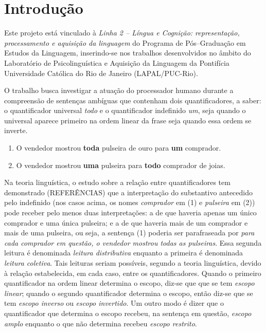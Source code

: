 \chapter{Introdução}
Este projeto está vinculado à \emph{Linha 2 -- Língua e Cognição: representação, processamento e aquisição da linguagem} do Programa de Pós--Graduação em Estudos da Linguagem, inserindo-se nos trabalhos desenvolvidos no âmbito do Laboratório de Psicolinguística e Aquisição da Linguagem da Pontifícia Universidade Católica do Rio de Janeiro (LAPAL/PUC-Rio).

O trabalho busca investigar a atuação do processador humano durante a compreensão de sentenças ambíguas que contenham dois quantificadores, a saber: o quantificador universal \emph{todo} e o quantificador indefinido \emph{um}, seja quando o universal aparece primeiro na ordem linear da frase seja quando essa ordem se inverte.

\begin{enumerate}
  \item O vendedor mostrou \textbf{toda} pulseira de ouro para \textbf{um} comprador.
  \item O vendedor mostrou \textbf{uma} pulseira para \textbf{todo} comprador de joias.
\end{enumerate}

Na teoria linguística, o estudo sobre a relação entre quantificadores tem demonstrado (REFERÊNCIAS) que a interpretação do substantivo antecedido pelo indefinido (nos casos acima, os nomes \emph{comprador} em (1) e \emph{pulseira} em (2)) pode receber pelo menos duas interpretações: a de que haveria apenas um único comprador e uma única pulseira; e a de que haveria mais de um comprador e mais de uma pulseira, ou seja, a sentença (1) poderia ser parafraseada por \emph{para cada comprador em questão, o vendedor mostrou todas as pulseiras}.
Essa segunda leitura é denominada \emph{leitura distributiva} enquanto a primeira é denominada \emph{leitura coletiva}. Tais leituras seriam possíveis, segundo a teoria linguística, devido à relação estabelecida, em cada caso, entre os quantificadores. Quando o primeiro quantificador na ordem linear determina o escopo, diz-se que que se tem \emph{escopo linear}; quando o segundo quantificador determina o escopo, então diz-se que se tem \emph{escopo inverso} ou \emph{escopo invertido}. Um outro modo é dizer que o quantificador que determina o escopo recebeu, na sentença em questão, \emph{escopo amplo} enquanto o que não determina recebeu \emph{escopo restrito}.

